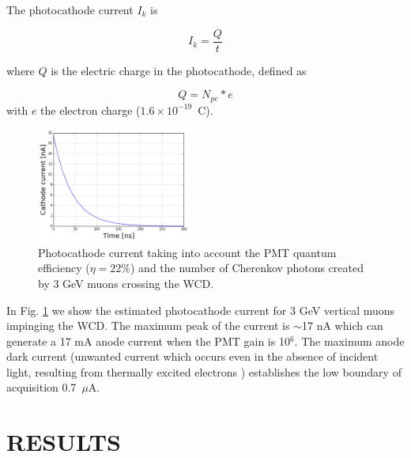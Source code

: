 \documentclass[letterpaper, 10 pt, conference]{ieeeconf}  %
\begin{document}

The photocathode current $I_k$ is 

\begin{equation}
I_k = \frac{Q}{t}
\end{equation}

\noindent where $Q$ is the electric charge in the photocathode, defined as

\begin{equation}
Q = N_{pe}*e
\end{equation}
with $e$ the electron charge ($1.6 \times 10^{-19}$~C). 

\begin{figure}[h!]
\begin{center}
\includegraphics[width=0.45\textwidth]{Figures/Cathode_current}
\caption{Photocathode current taking into account the PMT quantum efficiency ($\eta = 22 \%$) and the number of Cherenkov photons created by 3 GeV muons crossing the WCD.}
\label{cathode}
\end{center}
\end{figure}

In Fig. \ref{cathode} we show the estimated photocathode current for 3 GeV vertical muons impinging the WCD. The maximum peak of the current is $\sim$17 nA which can generate a 17 mA anode current when the PMT gain is 10$^6$. The maximum anode dark current (unwanted current which occurs even in the absence of incident light, resulting from thermally excited electrons ) establishes the low boundary of acquisition 0.7~$\mu$A.

\section{RESULTS}
\end{document}
